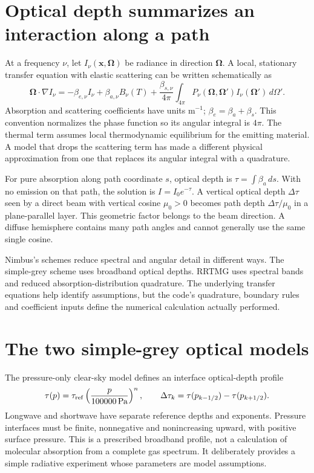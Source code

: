 \section{Optical depth summarizes an interaction along a path}

At a frequency $\nu$, let $I_\nu(\boldsymbol x,\boldsymbol\Omega)$ be radiance
in direction $\boldsymbol\Omega$. A local, stationary transfer equation with
elastic scattering can be written schematically as
\[
 \boldsymbol\Omega\cdot\nabla I_\nu
 =-\beta_{e,\nu}I_\nu+\beta_{a,\nu}B_\nu(T)
 +\frac{\beta_{s,\nu}}{4\pi}
    \int_{4\pi}P_\nu(\boldsymbol\Omega,\boldsymbol\Omega')
                      I_\nu(\boldsymbol\Omega')\,d\Omega'.
\]
Absorption and scattering coefficients have units $\mathrm{m^{-1}}$;
$\beta_e=\beta_a+\beta_s$. This convention normalizes the phase function so
its angular integral is $4\pi$. The thermal term assumes local thermodynamic
equilibrium for the emitting material. A model that drops the scattering term
has made a different physical approximation from one that replaces its angular
integral with a quadrature.

For pure absorption along path coordinate $s$, optical depth is
$\tau=\int\beta_a\,ds$. With no emission on that path, the solution is
$I=I_0e^{-\tau}$. A vertical optical depth $\Delta\tau$ seen by a direct beam
with vertical cosine $\mu_0>0$ becomes path depth $\Delta\tau/\mu_0$ in a
plane-parallel layer. This geometric factor belongs to the beam direction.
A diffuse hemisphere contains many path angles and cannot generally use the
same single cosine.

Nimbus's schemes reduce spectral and angular detail in different ways. The
simple-grey scheme uses broadband optical depths. RRTMG uses spectral bands and
reduced absorption-distribution quadrature. The underlying transfer equations
help identify assumptions, but the code's quadrature, boundary rules and
coefficient inputs define the numerical calculation actually performed.

\section{The two simple-grey optical models}

The pressure-only clear-sky model defines an interface optical-depth profile
\[
 \tau(p)=\tau_{\rm ref}
       \left(\frac{p}{100000\,\mathrm{Pa}}\right)^n,
 \qquad\Delta\tau_k=\tau(p_{k-1/2})-\tau(p_{k+1/2}).
\]
Longwave and shortwave have separate reference depths and exponents. Pressure
interfaces must be finite, nonnegative and nonincreasing upward, with positive
surface pressure. This is a prescribed broadband profile, not a calculation
of molecular absorption from a complete gas spectrum. It deliberately provides
a simple radiative experiment whose parameters are model assumptions.

